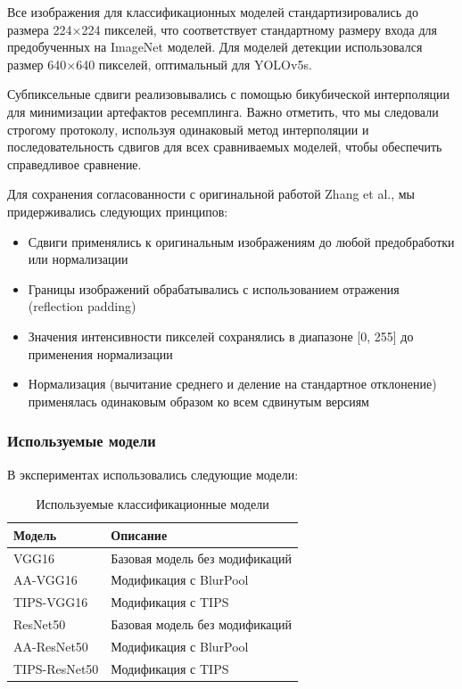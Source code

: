 Все изображения для классификационных моделей стандартизировались до размера 224×224 пикселей, что соответствует стандартному размеру входа для предобученных на ImageNet моделей. Для моделей детекции использовался размер 640×640 пикселей, оптимальный для YOLOv5s.

Субпиксельные сдвиги реализовывались с помощью бикубической интерполяции для минимизации артефактов ресемплинга. Важно отметить, что мы следовали строгому протоколу, используя одинаковый метод интерполяции и последовательность сдвигов для всех сравниваемых моделей, чтобы обеспечить справедливое сравнение.

Для сохранения согласованности с оригинальной работой Zhang et al., мы придерживались следующих принципов:
\begin{itemize}
    \item Сдвиги применялись к оригинальным изображениям до любой предобработки или нормализации
    \item Границы изображений обрабатывались с использованием отражения (reflection padding)
    \item Значения интенсивности пикселей сохранялись в диапазоне [0, 255] до применения нормализации
    \item Нормализация (вычитание среднего и деление на стандартное отклонение) применялась одинаковым образом ко всем сдвинутым версиям
\end{itemize}

\subsubsection{Используемые модели}
\label{sec:experiments:setup:models}

В экспериментах использовались следующие модели:

\begin{table}[ht]
\centering
\caption{Используемые классификационные модели}
\label{tab:classification_models}
\begin{tabular}{|l|p{}|}
\hline
\textbf{Модель} & \textbf{Описание} \\ \hline
VGG16 & Базовая модель без модификаций \\ \hline
AA-VGG16 & Модификация с BlurPool \\ \hline
TIPS-VGG16 & Модификация с TIPS \\ \hline
ResNet50 & Базовая модель без модификаций \\ \hline
AA-ResNet50 & Модификация с BlurPool \\ \hline
TIPS-ResNet50 & Модификация с TIPS \\ \hline
\end{tabular}
\end{table}

